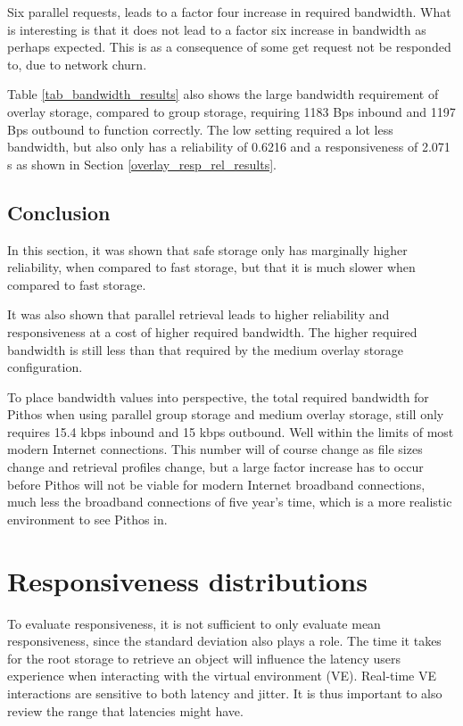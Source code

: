 Six parallel requests, leads to a factor four increase in required bandwidth. What is interesting is that it does not lead to a factor six increase in bandwidth as perhaps expected. This is as a consequence of some get request not be responded to, due to network churn.

Table \ref{tab_bandwidth_results} also shows the large bandwidth requirement of overlay storage, compared to group storage, requiring 1183 Bps inbound and 1197 Bps outbound to function correctly. The low setting required a lot less bandwidth, but also only has a reliability of 0.6216 and a responsiveness of 2.071 s as shown in Section \ref{overlay_resp_rel_results}.

\subsection{Conclusion}

In this section, it was shown that safe storage only has marginally higher reliability, when compared to fast storage, but that it is much slower when compared to fast storage.

It was also shown that parallel retrieval leads to higher reliability and responsiveness at a cost of higher required bandwidth. The higher required bandwidth is still less than that required by the medium overlay storage configuration.

To place bandwidth values into perspective, the total required bandwidth for Pithos when using parallel group storage and medium overlay storage, still only requires 15.4 kbps inbound and 15 kbps outbound. Well within the limits of most modern Internet connections. This number will of course change as file sizes change and retrieval profiles change, but a large factor increase has to occur before Pithos will not be viable for modern Internet broadband connections, much less the broadband connections of five year's time, which is a more realistic environment to see Pithos in.

\section{Responsiveness distributions}

To evaluate responsiveness, it is not sufficient to only evaluate mean responsiveness, since the standard deviation also plays a role. The time it takes for the root storage to retrieve an object will influence the latency users experience when interacting with the virtual environment (VE). Real-time VE interactions are sensitive to both latency and jitter. It is thus important to also review the range that latencies might have.

